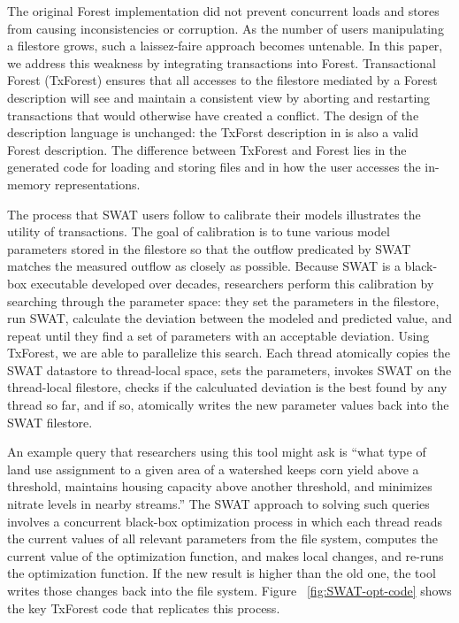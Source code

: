 
The original Forest implementation did not prevent concurrent loads
and stores from causing inconsistencies or corruption.  As the number
of users manipulating a filestore grows, such a laissez-faire approach
becomes untenable.  In this paper, we address this weakness by
integrating transactions into Forest.  Transactional Forest (TxForest)
ensures that all accesses to the filestore mediated by a Forest
description will see and maintain a consistent view by aborting and
restarting transactions that would otherwise have created a
conflict. The design of the description language is unchanged: the
TxForst description in  is also a valid
Forest description.  The difference between TxForest and Forest lies
in the generated code for loading and storing files and in how the
user accesses the in-memory representations.

The process that SWAT users follow to calibrate their models
illustrates the utility of transactions.  The goal of calibration is
to tune various model parameters stored in the filestore so that the
outflow predicated by SWAT matches the measured outflow as closely as
possible.  Because SWAT is a black-box executable developed over
decades, researchers perform this calibration by searching through the
parameter space: they set the parameters in the filestore, run SWAT,
calculate the deviation between the modeled and predicted value, and
repeat until they find a set of parameters with an acceptable
deviation.  Using TxForest, we are able to parallelize this search.
Each thread atomically copies the SWAT datastore to thread-local
space, sets the parameters, invokes SWAT on the thread-local
filestore, checks if the calculuated deviation is the best found by
any thread so far, and if so, atomically writes the new parameter
values back into the SWAT filestore.



An example query that researchers using this tool might ask is ``what
type of land use assignment to a given area of a watershed keeps corn
yield above a threshold, maintains housing capacity above another
threshold, and minimizes nitrate levels in nearby streams.''  The SWAT
approach to solving such queries involves a concurrent black-box
optimization process in which each thread reads the current values of
all relevant parameters from the file system, computes the current
value of the optimization function, and makes local changes, and
re-runs the optimization function. If the new result is higher than
the old one, the tool writes those changes back into the file system.
Figure ~\ref{fig:SWAT-opt-code} shows the key TxForest code that
replicates this process.


